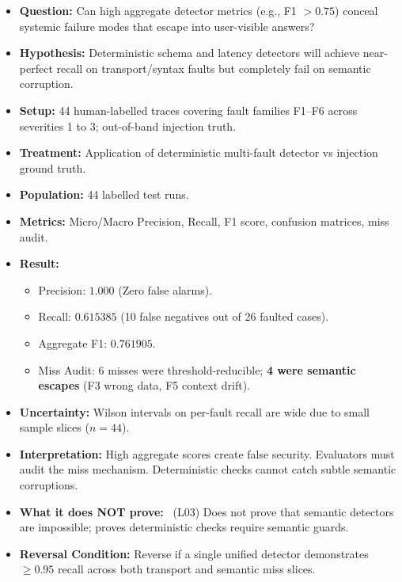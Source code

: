\begin{itemize}\setlength{\itemsep}{1.2pt}\setlength{\parsep}{0pt}\setlength{\parskip}{0pt}
    \item \textbf{Question:} Can high aggregate detector metrics (e.g., F1 $>0.75$) conceal systemic failure modes that escape into user-visible answers?
    \item \textbf{Hypothesis:} Deterministic schema and latency detectors will achieve near-perfect recall on transport/syntax faults but completely fail on semantic corruption.
    \item \textbf{Setup:} 44 human-labelled traces covering fault families F1--F6 across severities 1 to 3; out-of-band injection truth.
    \item \textbf{Treatment:} Application of deterministic multi-fault detector vs injection ground truth.
    \item \textbf{Population:} 44 labelled test runs.
    \item \textbf{Metrics:} Micro/Macro Precision, Recall, F1 score, confusion matrices, miss audit.
    \item \textbf{Result:} \MEASURED
    \begin{itemize}\setlength{\itemsep}{0.8pt}\setlength{\parsep}{0pt}
        \item Precision: $\mathbf{1.000}$ (Zero false alarms).
        \item Recall: $\mathbf{0.615385}$ (10 false negatives out of 26 faulted cases).
        \item Aggregate F1: $\mathbf{0.761905}$.
        \item Miss Audit: 6 misses were threshold-reducible; \textbf{4 were semantic escapes} (F3 wrong data, F5 context drift).
    \end{itemize}
    \item \textbf{Uncertainty:} Wilson intervals on per-fault recall are wide due to small sample slices ($n=44$).
    \item \textbf{Interpretation:} High aggregate scores create false security. Evaluators must audit the miss mechanism. Deterministic checks cannot catch subtle semantic corruptions.
    \item \textbf{What it does NOT prove:} \LIMITATION\ (L03) Does not prove that semantic detectors are impossible; proves deterministic checks require semantic guards.
    \item \textbf{Reversal Condition:} Reverse if a single unified detector demonstrates $\ge 0.95$ recall across both transport and semantic miss slices.
\end{itemize}
\endgroup

